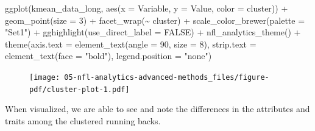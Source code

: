 \documentclass[
  letterpaper,
]{krantz}
\newenvironment{Shaded}{\begin{snugshade}}{\end{snugshade}}
\newcommand{\AttributeTok}[1]{\textcolor[rgb]{0.40,0.45,0.13}{#1}}
\newcommand{\ConstantTok}[1]{\textcolor[rgb]{0.56,0.35,0.01}{#1}}
\newcommand{\DecValTok}[1]{\textcolor[rgb]{0.68,0.00,0.00}{#1}}
\newcommand{\FunctionTok}[1]{\textcolor[rgb]{0.28,0.35,0.67}{#1}}
\newcommand{\NormalTok}[1]{\textcolor[rgb]{0.00,0.23,0.31}{#1}}
\newcommand{\SpecialCharTok}[1]{\textcolor[rgb]{0.37,0.37,0.37}{#1}}
\newcommand{\StringTok}[1]{\textcolor[rgb]{0.13,0.47,0.30}{#1}}
\begin{document}
\begin{Shaded}
\begin{Highlighting}[]
\FunctionTok{ggplot}\NormalTok{(kmean\_data\_long, }\FunctionTok{aes}\NormalTok{(}\AttributeTok{x =}\NormalTok{ Variable, }\AttributeTok{y =}\NormalTok{ Value, }\AttributeTok{color =}\NormalTok{ cluster)) }\SpecialCharTok{+}
  \FunctionTok{geom\_point}\NormalTok{(}\AttributeTok{size =} \DecValTok{3}\NormalTok{) }\SpecialCharTok{+}
  \FunctionTok{facet\_wrap}\NormalTok{(}\SpecialCharTok{\textasciitilde{}}\NormalTok{ cluster) }\SpecialCharTok{+}
  \FunctionTok{scale\_color\_brewer}\NormalTok{(}\AttributeTok{palette =} \StringTok{"Set1"}\NormalTok{) }\SpecialCharTok{+}
  \FunctionTok{gghighlight}\NormalTok{(}\AttributeTok{use\_direct\_label =} \ConstantTok{FALSE}\NormalTok{) }\SpecialCharTok{+}
  \FunctionTok{nfl\_analytics\_theme}\NormalTok{() }\SpecialCharTok{+}
  \FunctionTok{theme}\NormalTok{(}\AttributeTok{axis.text =} \FunctionTok{element\_text}\NormalTok{(}\AttributeTok{angle =} \DecValTok{90}\NormalTok{, }\AttributeTok{size =} \DecValTok{8}\NormalTok{),}
        \AttributeTok{strip.text =} \FunctionTok{element\_text}\NormalTok{(}\AttributeTok{face =} \StringTok{"bold"}\NormalTok{),}
        \AttributeTok{legend.position =} \StringTok{"none"}\NormalTok{)}
\end{Highlighting}
\end{Shaded}

\begin{figure}[H]

{\centering \texttt{[image: 05-nfl-analytics-advanced-methods\_files/figure-pdf/cluster-plot-1.pdf]}

}

\end{figure}

When visualized, we are able to see and note the differences in the
attributes and traits among the clustered running backs.
\end{document}
